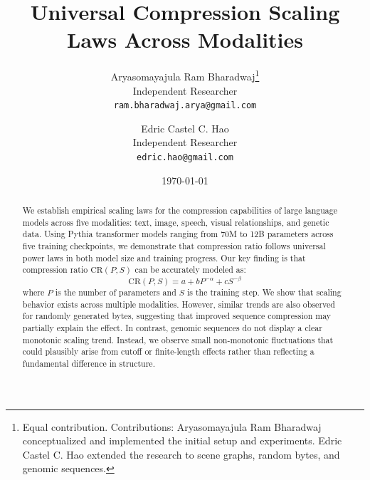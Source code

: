 \documentclass[11pt]{article}
\title{Universal Compression Scaling Laws Across Modalities}
\author{
  Aryasomayajula Ram Bharadwaj\thanks{%
  Equal contribution.
  \newline
  \newline
  Contributions: Aryasomayajula Ram Bharadwaj conceptualized and implemented the initial setup and experiments. Edric Castel C. Hao extended the research to scene graphs, random bytes, and genomic sequences.
  } \\
  Independent Researcher \\
  \texttt{ram.bharadwaj.arya@gmail.com}
  \and
  Edric Castel C. Hao\footnotemark[1] \\
  Independent Researcher \\
  \texttt{edric.hao@gmail.com}
}
\date{\today}
\begin{document}
\maketitle





\begin{abstract}
We establish empirical scaling laws for the compression capabilities of large language models across five modalities: text, image, speech, visual relationships, and genetic data. Using Pythia transformer models ranging from 70M to 12B parameters across five training checkpoints, we demonstrate that compression ratio follows universal power laws in both model size and training progress. Our key finding is that compression ratio $\mathrm{CR}(P,S)$ can be accurately modeled as:
\[
\mathrm{CR}(P,S) = a + b P^{-\alpha} + c S^{-\beta}
\]
where $P$ is the number of parameters and $S$ is the training step. We show that scaling behavior exists across multiple modalities. However, similar trends are also observed for randomly generated bytes, suggesting that improved sequence compression may partially explain the effect. In contrast, genomic sequences do not display a clear monotonic scaling trend. Instead, we observe small non-monotonic fluctuations that could plausibly arise from cutoff or finite-length effects rather than reflecting a fundamental difference in structure.

\end{abstract}
\end{document}
